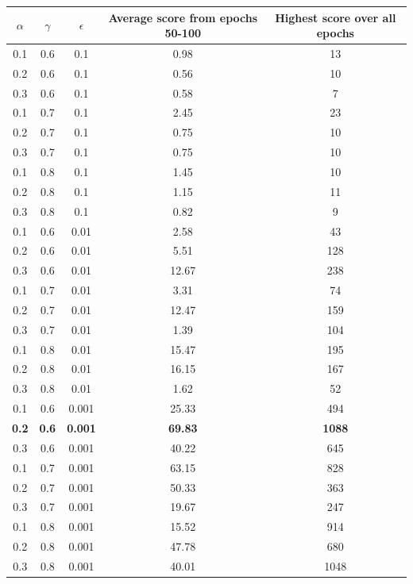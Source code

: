 \documentclass[submit]{harvardml}
\begin{document}
\begin{center}
\begin{tabular}{||c c c c c||} 
 \hline
 $\alpha$ & $\gamma$ & $\epsilon$ & Average score from epochs 50-100 & Highest score over all epochs \\ 
 \hline\hline
 0.1 & 0.6 & 0.1 & 0.98 & 13 \\ 
 \hline
 0.2 & 0.6 & 0.1 & 0.56 & 10 \\
 \hline
 0.3 & 0.6 & 0.1 & 0.58 & 7 \\
 \hline
 0.1 & 0.7 & 0.1 & 2.45 & 23 \\ 
 \hline
 0.2 & 0.7 & 0.1 & 0.75 & 10 \\
 \hline
 0.3 & 0.7 & 0.1 & 0.75 & 10 \\ 
 \hline
 0.1 & 0.8 & 0.1 & 1.45 & 10 \\ 
 \hline
 0.2 & 0.8 & 0.1 & 1.15 & 11 \\
 \hline
 0.3 & 0.8 & 0.1 & 0.82 & 9 \\ 
 \hline
 \hline
 0.1 & 0.6 & 0.01 & 2.58 & 43 \\ 
 \hline
 0.2 & 0.6 & 0.01 & 5.51 & 128 \\
 \hline
 0.3 & 0.6 & 0.01 & 12.67 & 238 \\
 \hline
 0.1 & 0.7 & 0.01 & 3.31 & 74 \\ 
 \hline
 0.2 & 0.7 & 0.01 & 12.47 & 159 \\
 \hline
 0.3 & 0.7 & 0.01 & 1.39 & 104 \\ 
 \hline
 0.1 & 0.8 & 0.01 & 15.47 & 195 \\ 
 \hline
 0.2 & 0.8 & 0.01 & 16.15 & 167 \\
 \hline
 0.3 & 0.8 & 0.01 & 1.62 & 52 \\ 
 \hline
 \hline
 0.1 & 0.6 & 0.001 & 25.33 & 494 \\ 
 \hline
 \textbf{0.2} & \textbf{0.6} & \textbf{0.001} & \textbf{69.83} & \textbf{1088} \\
 \hline
 0.3 & 0.6 & 0.001 & 40.22 & 645 \\
 \hline
 0.1 & 0.7 & 0.001 & 63.15 & 828 \\ 
 \hline
 0.2 & 0.7 & 0.001 & 50.33 & 363 \\
 \hline
 0.3 & 0.7 & 0.001 & 19.67 & 247 \\ 
 \hline
 0.1 & 0.8 & 0.001 & 15.52 & 914 \\ 
 \hline
 0.2 & 0.8 & 0.001 & 47.78 & 680 \\
 \hline
 {0.3} & {0.8} & {0.001} & {40.01} & {1048} \\ 
 \hline
\end{tabular}
\end{center}
\end{document}
